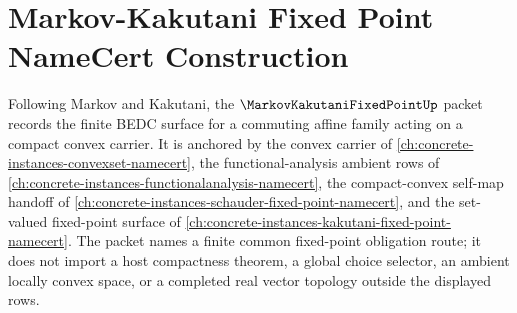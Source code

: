\chapter{Markov-Kakutani Fixed Point NameCert Construction}
\label{ch:concrete-instances-markov-kakutani-fixed-point-namecert}

Following Markov and Kakutani, the $\MarkovKakutaniFixedPointUp$ packet records the finite BEDC surface for a commuting affine family acting on a compact convex carrier. It is anchored by the convex carrier of \autoref{ch:concrete-instances-convexset-namecert}, the functional-analysis ambient rows of \autoref{ch:concrete-instances-functionalanalysis-namecert}, the compact-convex self-map handoff of \autoref{ch:concrete-instances-schauder-fixed-point-namecert}, and the set-valued fixed-point surface of \autoref{ch:concrete-instances-kakutani-fixed-point-namecert}. The packet names a finite common fixed-point obligation route; it does not import a host compactness theorem, a global choice selector, an ambient locally convex space, or a completed real vector topology outside the displayed rows.

